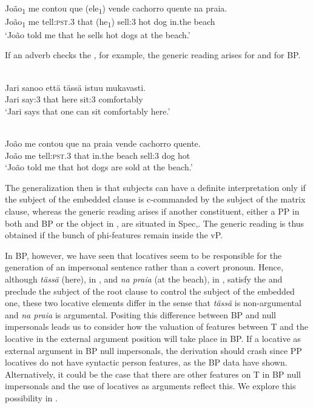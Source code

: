\documentclass[output=paper]{LSP/langsci}
\begin{document}
\ea\label{ex:39.alexiadou}
\\
\gll João\textsubscript{1} me contou que (ele\textsubscript{1}) vende cachorro quente na praia.\\
 João\textsubscript{1} me tell:\textsc{pst}.3 that (he\textsubscript{1}) sell:3 hot dog in.the beach\\
\glt ‘João told me that he sells hot dogs at the beach.’
\z


If an adverb checks the , for example, the generic reading arises  for  and  for BP.


\ea\label{ex:40.alexiadou}
\\
\gll Jari sanoo että tässä istuu mukavasti.\\
 Jari say:3 that here sit:3 comfortably\\
\glt ‘Jari says that one can sit comfortably here.’
\z


\ea\label{ex:41.alexiadou}
\\
\gll João me contou que na praia vende cachorro quente.\\
 João me tell:\textsc{pst}.3 that in.the beach sell:3 dog hot\\
\glt ‘João told me that hot dogs are sold at the beach.’
\z


The generalization then is that subjects can have a definite interpretation only if the subject of the embedded clause is c-commanded by the subject of the matrix clause, whereas the generic reading arises if another constituent, either a PP in both  and BP or the object in , are situated in Spec,. The generic reading is thus obtained if the bunch of phi-features remain inside the vP.

In BP, however, we have seen that locatives seem to be responsible for the generation of an impersonal sentence rather than a covert pronoun. Hence, although\textit{ tässä} (here), in , and \textit{na praia} (at the beach), in , satisfy the  and preclude the subject of the root clause to control the subject of the embedded one, these two locative elements differ in the sense that \textit{tässä} is non-argumental and \textit{na praia} is argumental. Positing this difference between BP and  null impersonals leads us to consider how the valuation of features between T and the locative in the external argument position will take place in BP. If a locative  as external argument in BP null impersonals, the derivation should crash since PP locatives do not have syntactic person features, as the BP data have shown. Alternatively, it could be the case that there are other features on T in BP null impersonals and the use of locatives as arguments reflect this. We explore this possibility in .
\end{document}
